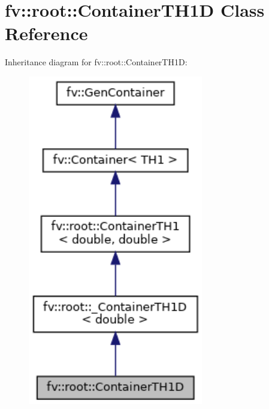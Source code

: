 \hypertarget{classfv_1_1root_1_1ContainerTH1D}{}\section{fv\+:\+:root\+:\+:Container\+T\+H1D Class Reference}
\label{classfv_1_1root_1_1ContainerTH1D}


Inheritance diagram for fv\+:\+:root\+:\+:Container\+T\+H1D\+:
\nopagebreak
\begin{figure}[H]
\begin{center}
\leavevmode
\includegraphics[width=217pt]{classfv_1_1root_1_1ContainerTH1D__inherit__graph}
\end{center}
\end{figure}


